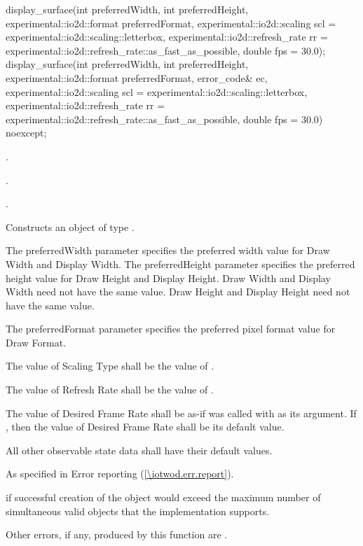 \begin{itemdecl}
display_surface(int preferredWidth, int preferredHeight, 
  experimental::io2d::format preferredFormat,
  experimental::io2d::scaling scl = experimental::io2d::scaling::letterbox,
  experimental::io2d::refresh_rate rr =
  experimental::io2d::refresh_rate::as_fast_as_possible, double fps = 30.0);
display_surface(int preferredWidth, int preferredHeight, 
  experimental::io2d::format preferredFormat, error_code& ec,
  experimental::io2d::scaling scl = experimental::io2d::scaling::letterbox,
  experimental::io2d::refresh_rate rr =
  experimental::io2d::refresh_rate::as_fast_as_possible, double fps = 30.0)
  noexcept;
\end{itemdecl}
\begin{itemdescr}
\pnum
\requires
{}.

\pnum
{}.

\pnum
{}.


\pnum
\effects
Constructs an object of type .

\pnum
The preferredWidth parameter specifies the preferred width value for Draw Width and Display Width. The preferredHeight parameter specifies the preferred height value for Draw Height and Display Height. Draw Width and Display Width need not have the same value. Draw Height and Display Height need not have the same value.

\pnum
The preferredFormat parameter specifies the preferred pixel format value for Draw Format.

\pnum
The value of Scaling Type shall be the value of .

\pnum
The value of Refresh Rate shall be the value of .

\pnum
The value of Desired Frame Rate shall be as-if  was called with  as its argument. If , then the value of Desired Frame Rate shall be its default value.

\pnum
All other observable state data shall have their default values.

\pnum
\throws
As specified in Error reporting (\ref{\iotwod.err.report}).

\pnum
\errors
{} if successful creation of the  object would exceed the maximum number of simultaneous valid  objects that the implementation supports.

\pnum
Other errors, if any, produced by this function are .
\end{itemdescr}


